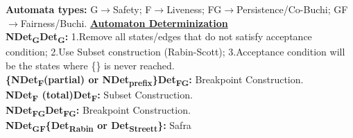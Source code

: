 \documentclass{article}
\newcommand{\Kb}{\pazocal{K}}
\newcommand{\Rb}{\pazocal{R}}
\begin{document}
\begin{multicols}{4}
%



\textbf{Automata types:} G$\rightarrow$Safety; F$\rightarrow$Liveness; FG$\rightarrow$Persistence/Co-Buchi; GF$\rightarrow$Fairness/Buchi.
\vfill
\columnbreak
\textbf{\underline{Automaton Determinization}}\\
\textbf{NDet\textsubscript{G}\textrightarrow Det\textsubscript{G}:} 
1.Remove all states/edges that do not satisfy acceptance condition;
2.Use Subset construction (Rabin-Scott);
3.Acceptance condition will be the states where \{\} is never reached. \\
\textbf{\{NDet\textsubscript{F}(partial) or NDet\textsubscript{prefix}\}\textrightarrow Det\textsubscript{FG}:} 
Breakpoint Construction. \\
\textbf{NDet\textsubscript{F} (total)\textrightarrow Det\textsubscript{F}:}
Subset Construction. \\
\textbf{NDet\textsubscript{FG}\textrightarrow Det\textsubscript{FG}:}
Breakpoint Construction.\\
\textbf{NDet\textsubscript{GF}\textrightarrow \{Det\textsubscript{Rabin} or Det\textsubscript{Streett}\}:}
Safra


\end{multicols}
\end{document}
